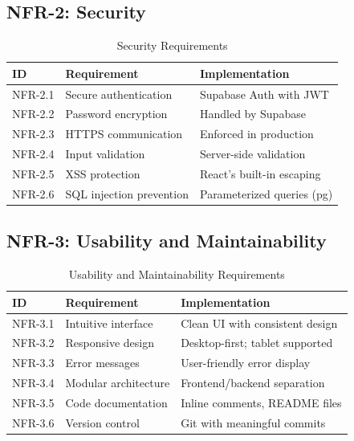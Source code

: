         \subsection{NFR-2: Security}
        \begin{table}[H]
        \centering
        \begin{tabular}{|l|l|l|}
        \hline
        \textbf{ID} & \textbf{Requirement} & \textbf{Implementation} \\
        \hline
        NFR-2.1 & Secure authentication & Supabase Auth with JWT \\
        NFR-2.2 & Password encryption & Handled by Supabase \\
        NFR-2.3 & HTTPS communication & Enforced in production \\
        NFR-2.4 & Input validation & Server-side validation \\
        NFR-2.5 & XSS protection & React's built-in escaping \\
        NFR-2.6 & SQL injection prevention & Parameterized queries (pg) \\
        \hline
        \end{tabular}
        \caption{Security Requirements}
        \end{table}

        \subsection{NFR-3: Usability and Maintainability}
        \begin{table}[H]
        \centering
        \begin{tabular}{|l|l|l|}
        \hline
        \textbf{ID} & \textbf{Requirement} & \textbf{Implementation} \\
        \hline
        NFR-3.1 & Intuitive interface & Clean UI with consistent design \\
        NFR-3.2 & Responsive design & Desktop-first; tablet supported \\
        NFR-3.3 & Error messages & User-friendly error display \\
        NFR-3.4 & Modular architecture & Frontend/backend separation \\
        NFR-3.5 & Code documentation & Inline comments, README files \\
        NFR-3.6 & Version control & Git with meaningful commits \\
        \hline
        \end{tabular}
        \caption{Usability and Maintainability Requirements}
        \end{table}
